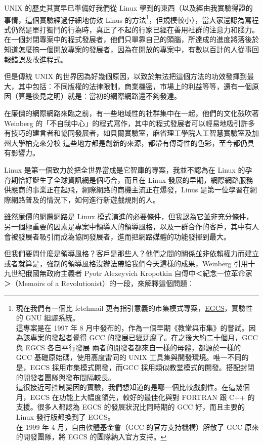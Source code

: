 \documentclass[12pt,]{article}
\makeatletter
\newcommand*{\shifttext}[2]{%
  \settowidth{\@tempdima}{#2}%
  \makebox[\@tempdima]{\hspace*{#1}#2}%
}
\makeatother
\begin{document}
UNIX 的歷史其實早已準備好我們從 Linux
學到的東西（以及經由我實驗得證的事情，這個實驗經過仔細地仿效 Linus
的方法\footnote{現在我們有一個比 fetchmail
  更有指引意義的市集模式專案，\href{http://egcs.cygnus.com/}{EGCS}，實驗性的
  GNU 組譯系統。\\這專案是在 1997 年 8
  月中發布的，作為一個早期《教堂與市集》的嘗試。因為該專案的發起者覺得
  GCC 的發展已經迂腐了。在之後大約二十個月，GCC 與 EGCS 各自平行發展
  \shifttext{1pt}{---}\shifttext{-1pt}{---} 兩者的開發者都來自一樣的母體，都源於一樣的 GCC
  基礎原始碼，使用高度雷同的 UNIX 工具集與開發環境。唯一不同的是，EGCS
  採用市集模式開發，而GCC
  採用類似教堂模式的開發。搭配封閉的開發者團隊與發布間隔較長。\\這很接近可控制變因的實驗，我們想知道的是哪一個比較戲劇性。在這幾個月，EGCS
  在功能上大幅度領先，較好的最佳化與對 FORTRAN 跟 C++
  的支援。很多人都認為 EGCS 的發展狀況比同時期的 GCC 好，而且主要的 Linux
  發行版都換到了 EGCS。\\在 1999 年 4 月，自由軟體基金會（GCC
  的官方支持機構）解散了 GCC 原來的開發團隊，將 EGCS 的團隊納入官方支持。}，但規模較小），當大家還認為寫程式仍然是單打獨鬥的行為時，真正了不起的行家已經在善用社群的注意力和腦力。在一個封閉專案中的程式發展者，他們只單靠自己的頭腦，所達成的進度將落後於知道怎麼搞一個開放專案的發展者，因為在開放的專案中，有數以百計的人從事回報錯誤及改進程式。

但是傳統 UNIX
的世界因為好幾個原因，以致於無法把這個方法的功效發揮到最大，其中包括︰不同版權的法律限制，商業機密，市場上的利益等等，還有一個原因（算是後見之明）就是︰當初的網際網路還不夠發達。

在廉價的網際網路來臨之前，有一些地域性的社群集中在一起，他們的文化鼓吹著
Weinberg
的「不自我中心」的程式寫作，其中的程式發展者可以輕易地吸引許多有技巧的建言者和協同發展者，如貝爾實驗室，麻省理工學院人工智慧實驗室及加州大學柏克來分校
\shifttext{1pt}{---}\shifttext{-1pt}{---} 這些地方都是創新的來源，都帶有傳奇性的色彩，至今都仍具有影響力。

Linux 是第一個致力於把全世界當成是它智庫的專案，我並不認為在 Linux
的孕育期恰好誕生了全球資訊網是個巧合，而且在 Linux
發展的早期，網際網路服務供應商的事業正在起飛，網際網路的商機主流正在爆發，Linus
是第一位學習在網際網路普及的情況下，如何進行新遊戲規則的人。

雖然廉價的網際網路是 Linux
模式演進的必要條件，但我認為它並非充分條件，另一個極重要的因素是專案中領導人的領導風格，以及一群合作的客戶，其中有人會被發展者吸引而成為協同發展者，進而把網路媒體的功能發揮到最大。

但我們要問什麼是領導風格？客戶是那些人？他們之間的關係並非依賴權力而建立
\shifttext{1pt}{---}\shifttext{-1pt}{---} 或者就算是，強制的領導風格沒辦法帶給我們今天這樣的成果，Weinberg
引用十九世紀俄國無政府主義者 Pyotr Alexeyvich Kropotkin
自傳中＜紀念一位革命家＞（Memoirs of a
Revolutionist）的一段，來解釋這個問題︰
\end{document}
